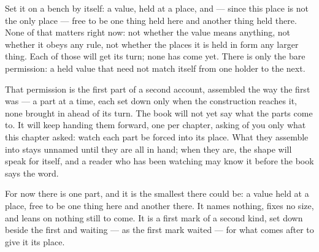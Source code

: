 Set it on a bench by itself: a value, held at a place, and --- since this place is not the only place --- free to be one thing held here and another thing held there. None of that matters right now: not whether the value means anything, not whether it obeys any rule, not whether the places it is held in form any larger thing. Each of those will get its turn; none has come yet. There is only the bare permission: a held value that need not match itself from one holder to the next.

That permission is the first part of a second account, assembled the way the first was --- a part at a time, each set down only when the construction reaches it, none brought in ahead of its turn. The book will not yet say what the parts come to. It will keep handing them forward, one per chapter, asking of you only what this chapter asked: watch each part be forced into its place. What they assemble into stays unnamed until they are all in hand; when they are, the shape will speak for itself, and a reader who has been watching may know it before the book says the word.

For now there is one part, and it is the smallest there could be: a value held at a place, free to be one thing here and another there. It names nothing, fixes no size, and leans on nothing still to come. It is a first mark of a second kind, set down beside the first and waiting --- as the first mark waited --- for what comes after to give it its place.
